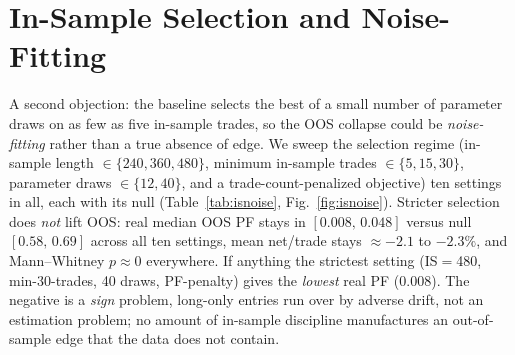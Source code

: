 \documentclass[12pt]{article}
\begin{document}
\section{In-Sample Selection and Noise-Fitting}\label{sec:isnoise}
A second objection: the baseline selects the best of a small number of parameter draws on as few as five in-sample trades, so the OOS collapse could be \emph{noise-fitting} rather than a true absence of edge. We sweep the selection regime (in-sample length $\in\{240,360,480\}$, minimum in-sample trades $\in\{5,15,30\}$, parameter draws $\in\{12,40\}$, and a trade-count-penalized objective) ten settings in all, each with its null (Table~\ref{tab:isnoise}, Fig.~\ref{fig:isnoise}). Stricter selection does \emph{not} lift OOS: real median OOS PF stays in $[0.008,\,0.048]$ versus null $[0.58,\,0.69]$ across all ten settings, mean net/trade stays $\approx-2.1$ to $-2.3\%$, and Mann--Whitney $p\!\approx\!0$ everywhere. If anything the strictest setting (IS$=$480, min-30-trades, 40 draws, PF-penalty) gives the \emph{lowest} real PF ($0.008$). The negative is a \emph{sign} problem, long-only entries run over by adverse drift, not an estimation problem; no amount of in-sample discipline manufactures an out-of-sample edge that the data does not contain.
\end{document}
